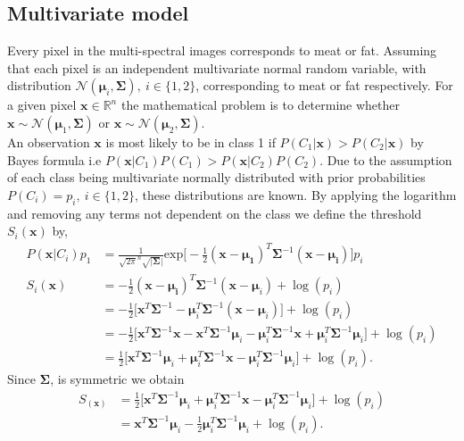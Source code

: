 \documentclass{article}
\begin{document}
\subsection{Multivariate model}
Every pixel in the multi-spectral images corresponds to meat or fat. Assuming that each pixel is an independent multivariate normal random variable, with distribution $\mathcal{N}(\boldsymbol{\mu}_i,\boldsymbol{\Sigma}),\:i\in\{1,2\}$, corresponding to meat or fat respectively. For a given pixel $\textbf{x}\in\mathbb{R}^n$ the mathematical problem is to determine whether $\textbf{x}\sim\mathcal{N}(\boldsymbol{\mu}_1,\boldsymbol{\Sigma})$ or $\textbf{x}\sim\mathcal{N}(\boldsymbol{\mu}_2,\boldsymbol{\Sigma})$.\\
An observation $\textbf{x}$ is most likely to be in class 1 if $P(C_1|\textbf{x})>P(C_2|\textbf{x})$ by Bayes formula i.e $P(\textbf{x}|C_1)P(C_1)>P(\textbf{x}|C_2)P(C_2)$. Due to the assumption of each class being multivariate normally distributed with prior probabilities $P(C_i)=p_i,\:i\in\{1,2\}$, these distributions are known. By applying the logarithm and removing any terms not dependent on the class we define the threshold $S_i(\textbf{x})$ by,
\begin{align*}
    P(\textbf{x}|C_i)p_1&=\frac{1}{\sqrt{2\pi}^n\sqrt{|\boldsymbol{\Sigma}}|}\text{exp}\bigg[-\frac{1}{2}(\textbf{x}-\boldsymbol{\mu_1})^T\boldsymbol{\Sigma}^{-1}(\textbf{x}-\boldsymbol{\mu_i})\bigg]p_i \\
    S_i(\textbf{x})&=-\frac{1}{2}(\textbf{x}-\boldsymbol{\mu_i})^T\boldsymbol{\Sigma}^{-1}(\textbf{x}-\boldsymbol{\mu}_i)+\log(p_i) \\
    &=-\frac{1}{2}\big[\textbf{x}^T\boldsymbol{\Sigma}^{-1}-\boldsymbol{\mu}^T_i\boldsymbol{\Sigma}^{-1}(\textbf{x}-\boldsymbol{\mu}_i)]+\log(p_i)\\
    &=-\frac{1}{2}\big[\textbf{x}^T\boldsymbol{\Sigma}^{-1}\textbf{x}-\textbf{x}^T\boldsymbol{\Sigma}^{-1}\boldsymbol{\mu}_i-\boldsymbol{\mu}_i^T\boldsymbol{\Sigma}^{-1}\textbf{x}+\boldsymbol{\mu}_i^T\boldsymbol{\Sigma}^{-1}\boldsymbol{\mu}_i\big]+\log(p_i) \\
    &=\frac{1}{2}\big[\textbf{x}^T\boldsymbol{\Sigma}^{-1}\boldsymbol{\mu}_i+\boldsymbol{\mu}_i^T\boldsymbol{\Sigma}^{-1}\textbf{x}-\boldsymbol{\mu}_i^T\boldsymbol{\Sigma}^{-1}\boldsymbol{\mu}_i\big]+\log(p_i).
\end{align*}
Since $\boldsymbol{\Sigma}$, is symmetric we obtain  
\begin{align*}
    S_(\textbf{x})&=\frac{1}{2}\big[\textbf{x}^T\boldsymbol{\Sigma}^{-1}\boldsymbol{\mu}_i+\boldsymbol{\mu}_i^T\boldsymbol{\Sigma}^{-1}\textbf{x}-\boldsymbol{\mu}_i^T\boldsymbol{\Sigma}^{-1}\boldsymbol{\mu}_i\big]+\log(p_i)\\
    &=\textbf{x}^T\boldsymbol{\Sigma}^{-1}\boldsymbol{\mu}_i-\frac{1}{2}\boldsymbol{\mu}_i^T\boldsymbol{\Sigma}^{-1}\boldsymbol{\mu}_i+\log(p_i).\\
\end{align*}
\end{document}
